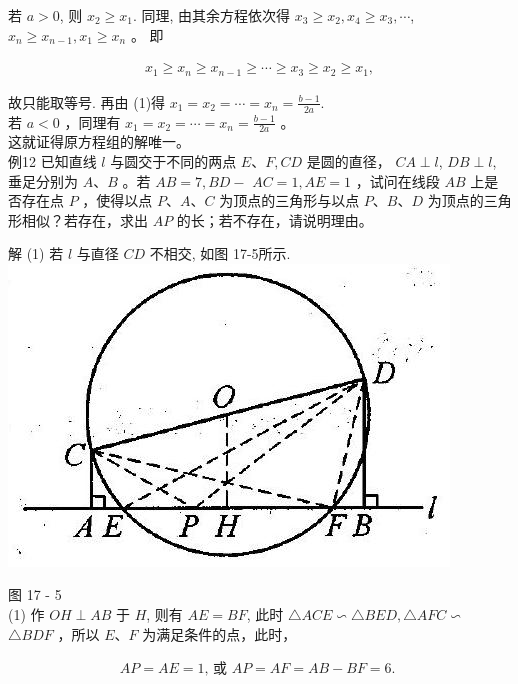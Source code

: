 \documentclass[10pt]{article}
\begin{document}
若 $a>0$, 则 $x_{2} \geqslant x_{1}$. 同理, 由其余方程依次得 $x_{3} \geqslant x_{2}, x_{4} \geqslant x_{3}, \cdots$, $x_{n} \geqslant x_{n-1}, x_{1} \geqslant x_{n}$ 。 即

\begin{align*}
x_{1} \geqslant x_{n} \geqslant x_{n-1} \geqslant \cdots \geqslant x_{3} \geqslant x_{2} \geqslant x_{1},
\end{align*}

故只能取等号. 再由 (1)得 $x_{1}=x_{2}=\cdots=x_{n}=\frac{b-1}{2 a}$.\\
若 $a<0$ ，同理有 $x_{1}=x_{2}=\cdots=x_{n}=\frac{b-1}{2 a}$ 。\\
这就证得原方程组的解唯一。\\
例12 已知直线 $l$ 与圆交于不同的两点 $E 、 F, C D$ 是圆的直径， $C A \perp l$, $D B \perp l$, 垂足分别为 $A 、 B$ 。若 $A B=7, B D-$ $A C=1, A E=1$ ，试问在线段 $A B$ 上是否存在点 $P$ ，使得以点 $P 、 A 、 C$ 为顶点的三角形与以点 $P 、 B 、 D$ 为顶点的三角形相似？若存在，求出 $A P$ 的长；若不存在，请说明理由。

解 (1) 若 $l$ 与直径 $C D$ 不相交, 如图 17-5所示.\\
\includegraphics[max width=\textwidth, center]{2024_10_30_26b590fd1106d28139f0g-118}

图 17 - 5\\
(1) 作 $O H \perp A B$ 于 $H$, 则有 $A E=B F$, 此时 $\triangle A C E \backsim \triangle B E D, \triangle A F C \backsim$ $\triangle B D F$ ，所以 $E 、 F$ 为满足条件的点，此时，

\begin{align*}
A P=A E=1 \text {, 或 } A P=A F=A B-B F=6 \text {. }
\end{align*}
\end{document}
